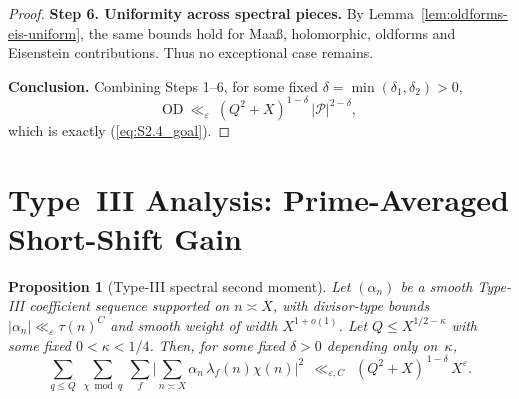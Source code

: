 \documentclass[11pt]{article}
\def\eqref#1{(\ref{#1})}%
\newtheorem{proposition}[lemma]{Proposition}
\theoremstyle{definition}
\theoremstyle{remark}
\numberwithin{equation}{part}
\begin{document}
\begin{proof}
	\smallskip
	\textbf{Step 6. Uniformity across spectral pieces.}
	By Lemma~\ref{lem:oldforms-eis-uniform}, the same bounds hold for Maa\ss, holomorphic, oldforms and Eisenstein contributions. Thus no exceptional case remains.

	\smallskip
	\textbf{Conclusion.}
	Combining Steps 1–6, for some fixed $\delta=\min(\delta_1,\delta_2)>0$,
	\[
		\mathrm{OD}\ \ll_\varepsilon\ (Q^2+X)^{1-\delta}\,|\mathcal P|^{2-\delta},
	\]
	which is exactly \eqref{eq:S2.4_goal}.
\end{proof}

\section{Type~III Analysis: Prime-Averaged Short-Shift Gain}

\begin{proposition}[Type-III spectral second moment]\label{prop:typeIII}
	Let $(\alpha_n)$ be a smooth Type-III coefficient sequence supported on $n\asymp X$, with divisor-type bounds $|\alpha_n|\ll_\varepsilon \tau(n)^C$ and smooth weight of width $X^{1+o(1)}$.
	Let $Q\le X^{1/2-\kappa}$ with some fixed $0<\kappa<1/4$. Then, for some fixed $\delta>0$ depending only on~$\kappa$,
	\[
		\sum_{q\le Q}\ \sum_{\chi\bmod q}\ \sum_{f}
		\Bigg|\sum_{n\asymp X}\alpha_n\,\lambda_f(n)\chi(n)\Bigg|^2
		\ \ \ll_{\varepsilon,C}\ \ (Q^2+X)^{\,1-\delta}\,X^{\varepsilon}.
	\]
\end{proposition}
\end{document}
